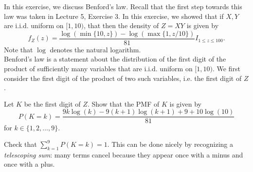 \documentclass[assignments]{subfiles}
\begin{document}
In this exercise, we discuss Benford's law. Recall that the first step towards this law was taken in Lecture 5, Exercise 3. In this exercise, we showed that if $X,Y$ are i.i.d. uniform on $[1, 10)$, that then the density of $Z = XY$ is given by $$f_Z(z) = \frac{\log(\min\{10,z\}) - \log(\max\{1, z/10\})}{81} I_{1 \leq z \leq 100}.$$
Note that $\log$ denotes the natural logarithm. \\
Benford's law is a statement about the distribution of the first digit of the product of sufficiently many variables that are i.i.d. uniform on $[1, 10)$. We first consider the first digit of the product of two such variables, i.e. the first digit of $Z$.


\begin{exercise}
Let $K$ be the first digit of $Z$. Show that the PMF of $K$ is given by
$$P(K = k)  = \frac{9k\log(k) - 9(k+1)\log(k+1) + 9+ 10 \log(10)}{81}$$
for $k \in \{1, 2, \ldots, 9\}$.

\end{exercise}


\begin{exercise}
Check that $\sum_{k=1}^9 P(K = k) = 1$. This can be done nicely by recognizing a \textit{telescoping sum}: many terms cancel because they appear once with a minus and once with a plus.

\end{exercise}
\end{document}
